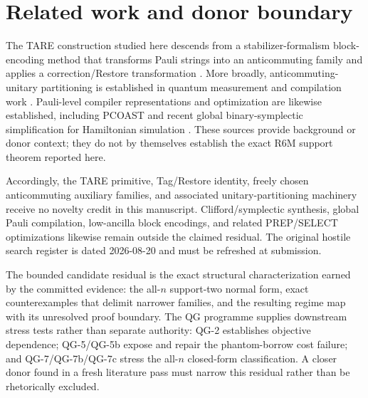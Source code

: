 \section{Related work and donor boundary}

The TARE construction studied here descends from a stabilizer-formalism block-encoding method that transforms Pauli strings into an anticommuting family and applies a correction/Restore transformation \cite{schillo2026blockencoding}. More broadly, anticommuting-unitary partitioning is established in quantum measurement and compilation work \cite{izmaylov2020unitary}. Pauli-level compiler representations and optimization are likewise established, including PCOAST \cite{paykin2023pcoast} and recent global binary-symplectic simplification for Hamiltonian simulation \cite{yang2026symphony}. These sources provide background or donor context; they do not by themselves establish the exact R6M support theorem reported here.

Accordingly, the TARE primitive, Tag/Restore identity, freely chosen anticommuting auxiliary families, and associated unitary-partitioning machinery receive no novelty credit in this manuscript. Clifford/symplectic synthesis, global Pauli compilation, low-ancilla block encodings, and related PREP/SELECT optimizations likewise remain outside the claimed residual. The original hostile search register is dated 2026-08-20 and must be refreshed at submission.

The bounded candidate residual is the exact structural characterization earned by the committed evidence: the all-$n$ support-two normal form, exact counterexamples that delimit narrower families, and the resulting regime map with its unresolved proof boundary. The QG programme supplies downstream stress tests rather than separate authority: QG-2 establishes objective dependence; QG-5/QG-5b expose and repair the phantom-borrow cost failure; and QG-7/QG-7b/QG-7c stress the all-$n$ closed-form classification. A closer donor found in a fresh literature pass must narrow this residual rather than be rhetorically excluded.